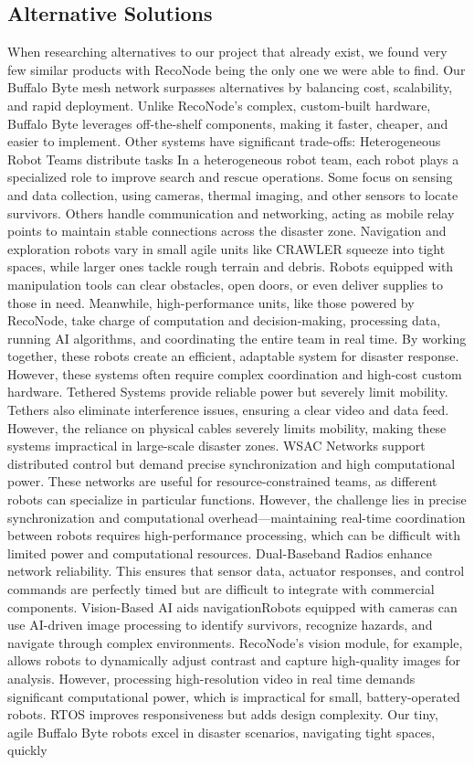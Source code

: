 \documentclass[10pt]{article}
\begin{document}
\subsection*{Alternative Solutions}
When researching alternatives to our project that already exist, we found very few similar products with RecoNode\cite{RecoNode} being the only one we were able to find. Our Buffalo Byte mesh network surpasses alternatives by balancing cost, scalability, and rapid deployment. Unlike RecoNode’s complex, custom-built hardware, Buffalo Byte leverages off-the-shelf components, making it faster, cheaper, and easier to implement. Other systems have significant trade-offs: Heterogeneous Robot Teams distribute tasks In a heterogeneous robot team, each robot plays a specialized role to improve search and rescue operations. Some focus on sensing and data collection, using cameras, thermal imaging, and other sensors to locate survivors. Others handle communication and networking, acting as mobile relay points to maintain stable connections across the disaster zone. Navigation and exploration robots vary in small agile units like CRAWLER squeeze into tight spaces, while larger ones tackle rough terrain and debris. Robots equipped with manipulation tools can clear obstacles, open doors, or even deliver supplies to those in need. Meanwhile, high-performance units, like those powered by RecoNode, take charge of computation and decision-making, processing data, running AI algorithms, and coordinating the entire team in real time. By working together, these robots create an efficient, adaptable system for disaster response. However, these systems often require complex coordination and high-cost custom hardware. Tethered Systems provide reliable power but severely limit mobility. Tethers also eliminate interference issues, ensuring a clear video and data feed. However, the reliance on physical cables severely limits mobility, making these systems impractical in large-scale disaster zones. WSAC Networks support distributed control but demand precise synchronization and high computational power. These networks are useful for resource-constrained teams, as different robots can specialize in particular functions. However, the challenge lies in precise synchronization and computational overhead—maintaining real-time coordination between robots requires high-performance processing, which can be difficult with limited power and computational resources. Dual-Baseband Radios enhance network reliability. This ensures that sensor data, actuator responses, and control commands are perfectly timed but are difficult to integrate with commercial components. Vision-Based AI aids navigationRobots equipped with cameras can use AI-driven image processing to identify survivors, recognize hazards, and navigate through complex environments. RecoNode’s vision module, for example, allows robots to dynamically adjust contrast and capture high-quality images for analysis. However, processing high-resolution video in real time demands significant computational power, which is impractical for small, battery-operated robots. RTOS improves responsiveness but adds design complexity. Our tiny, agile Buffalo Byte robots excel in disaster scenarios, navigating tight spaces, quickly 
\end{document}
